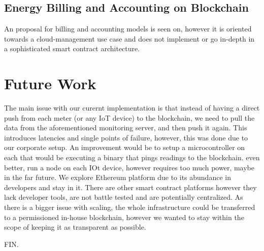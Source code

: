 \subsection{Energy Billing and Accounting on Blockchain}
An proposal for billing and accounting models is seen on\cite{billaccount}, however it is oriented towards a cloud-management use case and does not implement or go in-depth in a sophisticated smart contract architecture. 


\section{Future Work}
The main issue with our curernt implementation is that instead of having a direct push from each meter (or any IoT device) to the blockchain, we need to pull the data from the aforementioned monitoring server, and then push it again. This introduces latencies and single points of failure, however, this was done due to our corporate setup. An improvement would be to setup a microcontroller on each that would be executing a binary that pings readings to the blockchain. even better, run a node on each IOt device, however requires too much power, maybe in the far future. We explore Ethereum platform due to its abundance in developers and stay in it. There are other smart contract platforms however they lack developer tools, are not battle tested and are potentially centralized. As there is a bigger issue with scaling, the whole infrastructure could be transferred to a permissioned in-house blockchain, however we wanted to stay within the scope of keeping it as transparent as possible.

FIN.